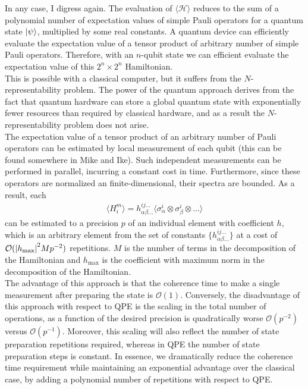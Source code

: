 \documentclass{book}
\theoremstyle{definition}
\newcommand{\had}{\mathcal{H}}
\newcommand{\al}{\alpha}
\newcommand{\be}{\beta}
\begin{document}
In any case, I digress again. The evaluation of $\langle \had \rangle $ reduces to the sum of a polynomial number of expectation values of simple Pauli operators for a quantum state $\ket{\psi}$,  multiplied by some real constants. A quantum device can efficiently evaluate the expectation value of a tensor product of arbitrary number of simple Pauli operators. Therefore, with an $n$-qubit state we can efficient evaluate the expectation value of this $2^n \times 2^n$ Hamiltonian.\\

This is possible with a classical computer, but it suffers from the $N$-representability problem. The power of the quantum approach derives from the fact that quantum hardware can store a global quantum state with exponentially fewer resources than required by classical hardware, and as a result the $N$-representability problem does not arise. \\


The expectation value of a tensor product of an arbitrary
number of Pauli operators can be estimated by local measurement of each qubit (this can be found somewhere in Mike and Ike). Such independent measurements can be performed in parallel, incurring a constant cost in time. Furthermore, since these operators are normalized an finite-dimensional, their spectra are bounded. As a result, each
\begin{align}
\langle H^m_i\rangle = h^{ij\dots}_{\al\be\dots} \langle \sigma^i_\al \otimes \sigma^i_\be \otimes \dots \rangle  
\end{align}
can be estimated to a precision $p$ of an individual element with coefficient $h$, which is an arbitrary element from the set of constants $\{ h^{ij\dots}_{\al\be\dots}\}$ at a cost of $\mathcal{O}(\abs{h_\text{max}}^2 Mp^{-2})$ repetitions. $M$ is the number of terms in the decomposition of the Hamiltonian and $h_\text{max}$ is the coefficient with maximum norm in the decomposition of the Hamiltonian. \\


The advantage of this approach is that the coherence time to make a single measurement after preparing
the state is $\mathcal{O}(1)$. Conversely, the disadvantage of this approach with respect to QPE is the scaling in the total number of
operations, as a function of the desired precision is quadratically
worse $\mathcal{O}(p^{-2})$ versus $\mathcal{O}(p^{-1})$.  Moreover, this scaling will also reflect the number of state preparation repetitions required, whereas in QPE the number of state preparation steps is constant. In essence, we dramatically reduce the coherence time requirement while maintaining an exponential advantage over
the classical case, by adding a polynomial number of repetitions
with respect to QPE.
\end{document}
